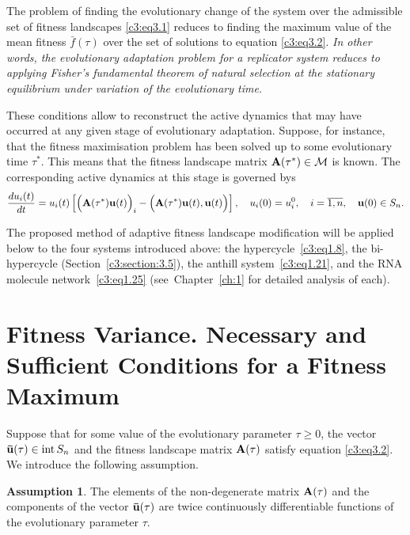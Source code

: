 \documentclass[12pt]{report}
\newcommand{\inside}{\mathrm{int}\,}
\theoremstyle{definition}
\newtheorem{assumpt}[theorem]{Assumption}
\theoremstyle{remark}
\begin{document}
The problem of finding the evolutionary change of the system over the admissible set of fitness landscapes \eqref{c3:eq3.1} reduces to finding the maximum value of the mean fitness $\bar{f}(\tau)$ over the set of solutions to equation \eqref{c3:eq3.2}. {\it In other words, the evolutionary adaptation problem for a replicator system reduces to applying Fisher's fundamental theorem of natural selection at the stationary equilibrium under variation of the evolutionary time.}

These conditions allow to reconstruct the active dynamics that may have occurred at any given stage of evolutionary adaptation. Suppose, for instance, that the fitness maximisation problem has been solved up to some evolutionary time $\tau^{*}$. This means that the fitness landscape matrix ${\bf A}(\tau^{*}) \in \mathcal{M}$ is known. The corresponding active dynamics at this stage is governed bys
$$
	\frac{du_{i}(t)}{dt} = u_{i}(t)\left[\Big({\bf A}(\tau^{*}){\bf u}(t)\Big)_{i} - \Big({\bf A}(\tau^{*}){\bf u}(t), {\bf u}(t)\Big)\right],
	\quad u_{i}(0) = u_{i}^{0}, \quad i = \overline{1, n}, \quad {\bf u}(0) \in S_{n}.
$$

The proposed method of adaptive fitness landscape modification will be applied below to the four systems introduced above: the hypercycle~\eqref{c3:eq1.8}, the bi-hypercycle (Section~\ref{c3:section:3.5}), the anthill system~\eqref{c3:eq1.21}, and the RNA molecule network~\eqref{c3:eq1.25} (see~Chapter~\ref{ch:1} for detailed analysis of each).

\clearpage

\section{Fitness Variance. Necessary and Sufficient Conditions for a Fitness Maximum}\label{c3:section:3.2}

Suppose that for some value of the evolutionary parameter $\tau \geqslant 0$, the vector ${\bf \bar{u}}(\tau) \in \inside S_{n}$ and the fitness landscape matrix ${\bf A}(\tau)$ satisfy equation \eqref{c3:eq3.2}. We introduce the following assumption.

\begin{assumpt}\label{c3:assumpt3.1}
	The elements of the non-degenerate matrix ${\bf A}(\tau)$ and the components of the vector ${\bf \bar{u}}(\tau)$ are twice continuously differentiable functions of the evolutionary parameter $\tau$.
\end{assumpt}
\end{document}
